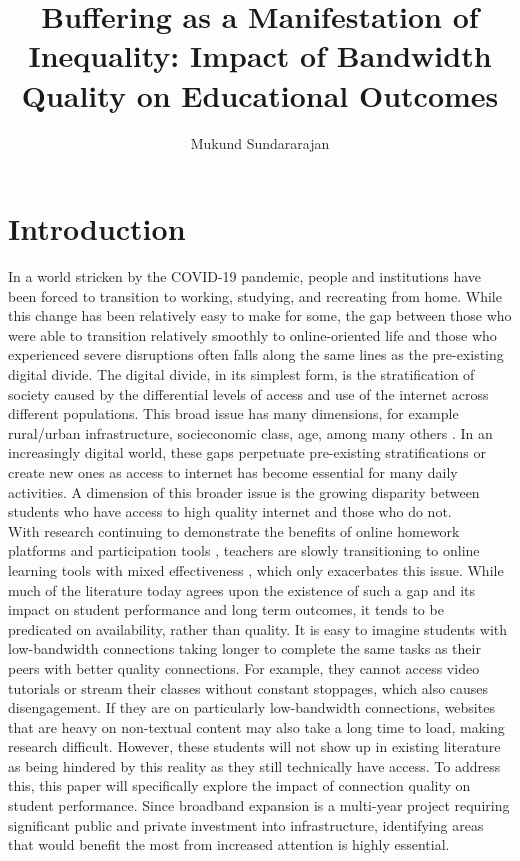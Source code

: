 \documentclass[stu, floatsintext]{apa7}
\title{Buffering as a Manifestation of Inequality: Impact of Bandwidth Quality on Educational Outcomes}
\author{Mukund Sundararajan}
\affiliation{University of British Columbia}
\begin{document}
    \maketitle
    \section{Introduction}
    In a world stricken by the COVID-19 pandemic, people and institutions have been forced to transition to working, studying, and recreating from home. While this change has been relatively easy to make for some, the gap between those who were able to transition relatively smoothly to online-oriented life and those who experienced severe disruptions often falls along the same lines as the pre-existing digital divide. The digital divide, in its simplest form, is the stratification of society caused by the differential levels of access and use of the internet across different populations. This broad issue has many dimensions, for example rural/urban infrastructure, socieconomic class, age, among many others \autocite[p.~1-2]{ragnedda2013}. In an increasingly digital world, these gaps perpetuate pre-existing stratifications or create new ones as access to internet has become essential for many daily activities. A dimension of this broader issue is the growing disparity between students who have access to high quality internet and those who do not. \\
    
    With research continuing to demonstrate the benefits of online homework platforms and participation tools \autocite{wooley2015, balta2017, smithrud2015}, teachers are slowly transitioning to online learning tools with mixed effectiveness \autocite{blikstad2020}, which only exacerbates this issue. While much of the literature today agrees upon the existence of such a gap and its impact on student performance and long term outcomes, it tends to be predicated on availability, rather than quality. It is easy to imagine students with low-bandwidth connections taking longer to complete the same tasks as their peers with better quality connections. For example, they cannot access video tutorials or stream their classes without constant stoppages, which also causes disengagement. If they are on particularly low-bandwidth connections, websites that are heavy on non-textual content may also take a long time to load, making research difficult. However, these students will not show up in existing literature as being hindered by this reality as they still technically have access. To address this, this paper will specifically explore the impact of connection quality on student performance. Since broadband expansion is a multi-year project requiring significant public and private investment into infrastructure, identifying areas that would benefit the most from increased attention is highly essential. \\
\end{document}
